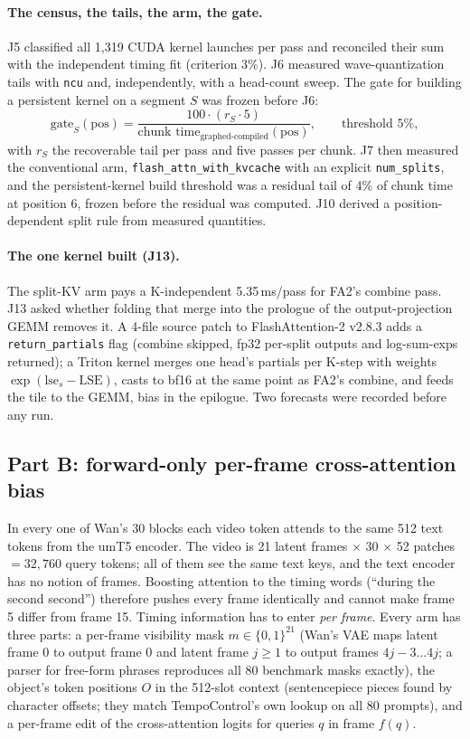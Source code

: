 \documentclass[10pt,a4paper]{article}
\begin{document}
\paragraph{The census, the tails, the arm, the gate.} J5 classified all 1{,}319 CUDA kernel launches per pass and reconciled their sum with the independent timing fit (criterion 3\%). J6 measured wave-quantization tails with \texttt{ncu} and, independently, with a head-count sweep. The gate for building a persistent kernel on a segment $S$ was frozen before J6:
\[
\text{gate}_S(\text{pos}) = \frac{100\cdot(r_S\cdot 5)}{\text{chunk time}_{\text{graphed-compiled}}(\text{pos})},\qquad \text{threshold } 5\%,
\]
with $r_S$ the recoverable tail per pass and five passes per chunk. J7 then measured the conventional arm, \texttt{flash\_attn\_with\_kvcache} with an explicit \texttt{num\_splits}, and the persistent-kernel build threshold was a residual tail of 4\% of chunk time at position 6, frozen before the residual was computed. J10 derived a position-dependent split rule from measured quantities.

\paragraph{The one kernel built (J13).} The split-KV arm pays a K-independent 5.35\,ms/pass for FA2's combine pass. J13 asked whether folding that merge into the prologue of the output-projection GEMM removes it. A 4-file source patch to FlashAttention-2 v2.8.3 adds a \texttt{return\_partials} flag (combine skipped, fp32 per-split outputs and log-sum-exps returned); a Triton kernel merges one head's partials per K-step with weights $\exp(\text{lse}_s-\text{LSE})$, casts to bf16 at the same point as FA2's combine, and feeds the tile to the GEMM, bias in the epilogue. Two forecasts were recorded before any run.

\subsection{Part B: forward-only per-frame cross-attention bias}
In every one of Wan's 30 blocks each video token attends to the same 512 text tokens from the umT5 encoder. The video is 21 latent frames $\times$ 30 $\times$ 52 patches $=32{,}760$ query tokens; all of them see the same text keys, and the text encoder has no notion of frames. Boosting attention to the timing words (``during the second second'') therefore pushes every frame identically and cannot make frame 5 differ from frame 15. Timing information has to enter \emph{per frame}. Every arm has three parts: a per-frame visibility mask $m\in\{0,1\}^{21}$ (Wan's VAE maps latent frame 0 to output frame 0 and latent frame $j\ge1$ to output frames $4j-3\ldots4j$; a parser for free-form phrases reproduces all 80 benchmark masks exactly), the object's token positions $O$ in the 512-slot context (sentencepiece pieces found by character offsets; they match TempoControl's own lookup on all 80 prompts), and a per-frame edit of the cross-attention logits for queries $q$ in frame $f(q)$.
\end{document}
